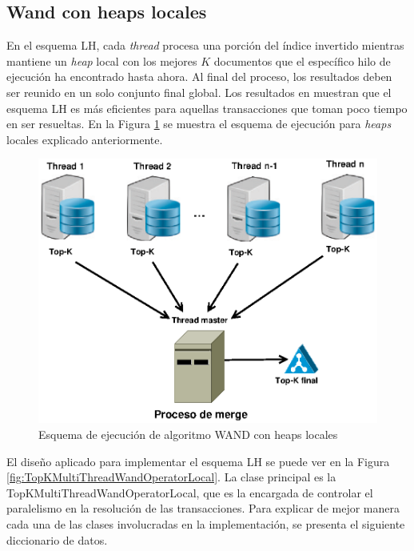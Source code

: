 \subsection{Wand con heaps locales}
En el esquema LH, cada \textit{thread} procesa una porción del índice invertido mientras mantiene un \textit{heap} local con los mejores $K$ documentos que el específico hilo de ejecución ha encontrado hasta ahora. Al final del proceso, los resultados deben ser reunido en un solo conjunto final global. Los resultados en \citep{Rojas:2013} muestran que el esquema LH es más eficientes para aquellas transacciones que toman poco tiempo en ser resueltas. En la Figura \ref{fig:wand-heap-local} se muestra el esquema de ejecución para \textit{heaps} locales explicado anteriormente. 

\begin{figure}[!ht]
\centering
\includegraphics[scale=.75]{images/wand_heaps_locales.eps}
\caption{Esquema de ejecución de algoritmo WAND con heaps locales}
\label{fig:wand-heap-local}
\end{figure}

El diseño aplicado para implementar el esquema LH se puede ver en la Figura \ref{fig:TopKMultiThreadWandOperatorLocal}. La clase principal es la TopKMultiThreadWandOperatorLocal, que es la encargada de controlar el paralelismo en la resolución de las transacciones. Para explicar de mejor manera cada una de las clases involucradas en la implementación, se presenta el siguiente diccionario de datos.

